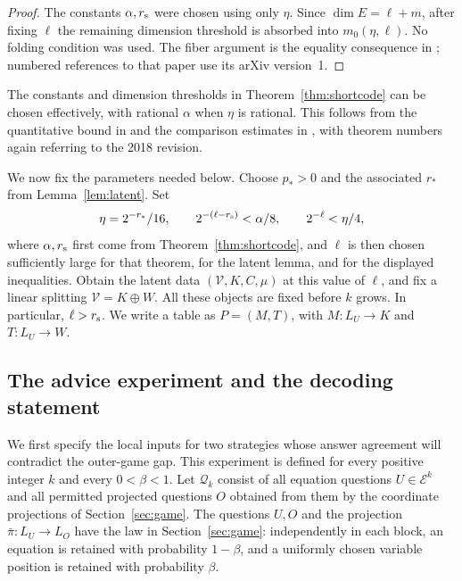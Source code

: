 \begin{proof}
The constants $\alpha,r_{\rm s}$ were chosen using only $\eta$.
Since $\dim E=\ell+m$, after fixing $\ell$ the remaining dimension
threshold is absorbed into $m_0(\eta,\ell)$.  No folding condition was
used.  The fiber argument is the equality consequence in
\cite[Lemma~2.3]{BKS18}; numbered references to that paper use its
arXiv version~1.
\end{proof}

The constants and dimension thresholds in Theorem~\ref{thm:shortcode}
can be chosen effectively, with rational $\alpha$ when $\eta$ is rational.
This follows from the quantitative bound in
\cite[Theorem~2.13 and Section~2.4]{KMS23} and the comparison estimates
in \cite[Lemmas~2.7--2.8]{KMS23}, with theorem numbers again referring to
the 2018 revision.

We now fix the parameters needed below.  Choose $p_*>0$ and the associated
$r_*$ from Lemma~\ref{lem:latent}.  Set
\begin{equation}
 \eta=2^{-r_*}/16,
 \qquad
 2^{-(\ell-r_{\rm s})}<\alpha/8,
 \qquad
 2^{-\ell}<\eta/4,
 \label{eq:matrix-parameters}
\end{equation}
where $\alpha,r_{\rm s}$ first come from Theorem~\ref{thm:shortcode},
and $\ell$ is then chosen sufficiently large for that theorem, for the
latent lemma, and for the displayed inequalities.  Obtain the latent data
$(\mathcal V,K,C,\mu)$ at this value of $\ell$, and fix a linear splitting
$\mathcal V=K\oplus W$.  All these objects are fixed before $k$ grows.
In particular, $\ell>r_{\rm s}$.  We write a table as $P=(M,T)$, with
$M:L_U\to K$ and $T:L_U\to W$.

\subsection{The advice experiment and the decoding statement}

We first specify the local inputs for two strategies whose answer agreement
will contradict the outer-game gap.  This experiment is defined for every positive integer $k$
and every $0<\beta<1$.  Let $\mathcal Q_k$ consist of all equation
questions $U\in\mathcal E^k$ and all permitted projected questions $O$
obtained from them by the coordinate projections of Section~\ref{sec:game}.
The questions $U,O$ and the projection
$\bar\pi:L_U\to L_O$ have the law in Section~\ref{sec:game}: independently
in each block, an equation is retained with probability $1-\beta$, and a
uniformly chosen variable position is retained with probability $\beta$.

